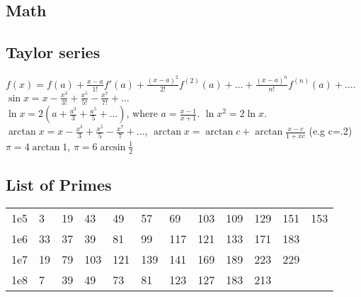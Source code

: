 \documentclass[12pt]{extarticle}
\begin{document}
\begin{multicols*}{2}


\section{Math}


\subsection{Taylor series}
$f(x) = f(a) + \frac{x-a}{1!} f'(a) + \frac{(x-a)^2}{2!} f^{(2)}(a) + \dots + \frac{(x-a)^n}{n!} f^{(n)}(a) + \dots$. \\
$\sin x = x - \frac{x^3}{3!} + \frac{x^5}{5!} - \frac{x^7}{7!} + \dots$ \\
$\ln x = 2(a+\frac{a^3}{3}+\frac{a^5}{5}+\dots)$, where $a=\frac{x-1}{x+1}$. $\ln x^2 = 2 \ln x$. \\
$\arctan x = x - \frac{x^3}{3} + \frac{x^5}{5} - \frac{x^7}{7} + \dots$,
$\arctan x = \arctan c + \arctan \frac{x-c}{1+xc}$ (e.g c=.2) \\
$\pi = 4 \arctan 1$, $\pi = 6 \arcsin \frac{1}{2}$


\subsection{List of Primes}

\begin{tabular}{l l l l l l l l l l l l}
    1e5 & 3 & 19 & 43 & 49 & 57 & 69 & 103 & 109 & 129 & 151 & 153 \\
    1e6 & 33 & 37 & 39 & 81 & 99 & 117 & 121 & 133 & 171 & 183 \\
    1e7 & 19 & 79 & 103 & 121 & 139 & 141 & 169 & 189 & 223 & 229 \\
    1e8 & 7 & 39 & 49 & 73 & 81 & 123 & 127 & 183 & 213 \\
\end{tabular}

\end{multicols*}
\end{document}
